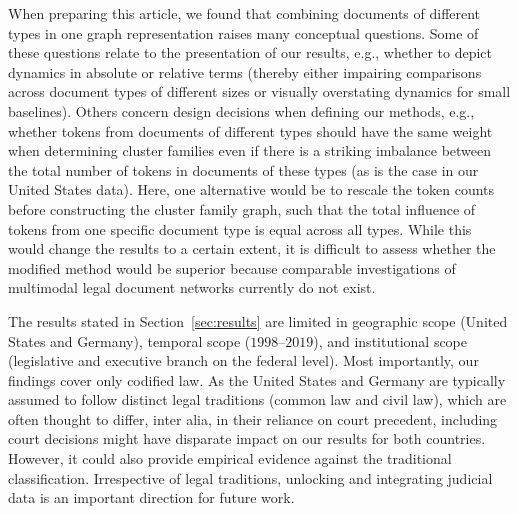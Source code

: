 \documentclass[utf8,sort&compress,table,hidelinks]{frontiersFPHY} %
\begin{document}
When preparing this article, we found that combining documents of different types in one graph representation raises many conceptual questions.
Some of these questions relate to the presentation of our results, e.g., 
whether to depict dynamics in absolute or relative terms (thereby either impairing comparisons across document types of different sizes or visually overstating dynamics for small baselines).
Others concern design decisions when defining our methods, 
e.g., whether tokens from documents of different types should have the same weight when determining cluster families even if there is a striking imbalance between the total number of tokens in documents of these types (as is the case in our United States data).
Here, one alternative would be to rescale the token counts before constructing the cluster family graph, 
such that the total influence of tokens from one specific document type is equal across all types.
While this would change the results to a certain extent, 
it is difficult to assess whether the modified method would be superior because comparable investigations of multimodal legal document networks currently do not exist.

The results stated in Section~\ref{sec:results} are limited in geographic scope (United States and Germany), temporal scope ($1998$--$2019$), and institutional scope (legislative and executive branch on the federal level).
Most importantly, our findings cover only codified law.
As the United States and Germany are typically assumed to follow distinct legal traditions (common law and civil law), 
which are often thought to differ, inter alia, in their reliance on court precedent, including court decisions might have disparate impact on our results for both countries.
However, it could also provide empirical evidence against the traditional classification.
Irrespective of legal traditions, unlocking and integrating judicial data is an important direction for future work.
\end{document}
